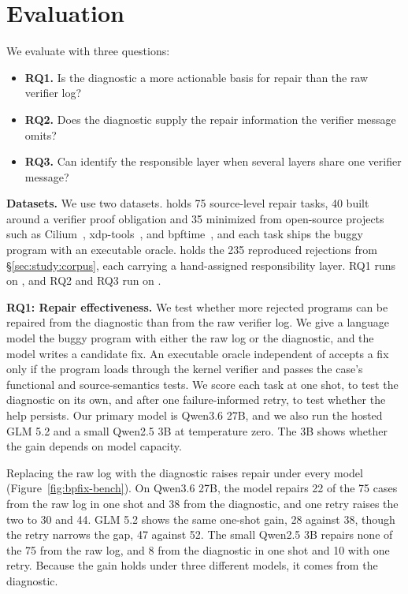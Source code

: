 \section{Evaluation}
\label{sec:evaluation}

We evaluate \sys with three questions:
\begin{itemize}
  \item \textbf{RQ1.} Is the \sys diagnostic a more actionable basis for repair than the raw verifier log?
  \item \textbf{RQ2.} Does the \sys diagnostic supply the repair information the verifier message omits?
  \item \textbf{RQ3.} Can \sys identify the responsible layer when several layers share one verifier message?
\end{itemize}

\noindent\textbf{Datasets.} We use two datasets. \bench holds 75 source-level repair tasks, 40 built around a verifier proof obligation and 35 minimized from open-source projects such as Cilium~\cite{cilium}, xdp-tools~\cite{xdptools}, and bpftime~\cite{zheng2025extending}, and each task ships the buggy program with an executable oracle. \empiricalset holds the 235 reproduced rejections from \S\ref{sec:study:corpus}, each carrying a hand-assigned responsibility layer. RQ1 runs on \bench, and RQ2 and RQ3 run on \empiricalset. 

\noindent\textbf{RQ1: Repair effectiveness.} We test whether more rejected programs can be repaired from the \sys diagnostic than from the raw verifier log. We give a language model the buggy program with either the raw log or the \sys diagnostic, and the model writes a candidate fix. An executable oracle independent of \sys accepts a fix only if the program loads through the kernel verifier and passes the case's functional and source-semantics tests. We score each task at one shot, to test the diagnostic on its own, and after one failure-informed retry, to test whether the help persists. Our primary model is Qwen3.6 27B, and we also run the hosted GLM 5.2 and a small Qwen2.5 3B at temperature zero. The 3B shows whether the gain depends on model capacity. 

Replacing the raw log with the \sys diagnostic raises repair under every model (Figure~\ref{fig:bpfix-bench}). On Qwen3.6 27B, the model repairs 22 of the 75 cases from the raw log in one shot and 38 from the diagnostic, and one retry raises the two to 30 and 44. GLM 5.2 shows the same one-shot gain, 28 against 38, though the retry narrows the gap, 47 against 52. The small Qwen2.5 3B repairs none of the 75 from the raw log, and 8 from the diagnostic in one shot and 10 with one retry. Because the gain holds under three different models, it comes from the diagnostic.


